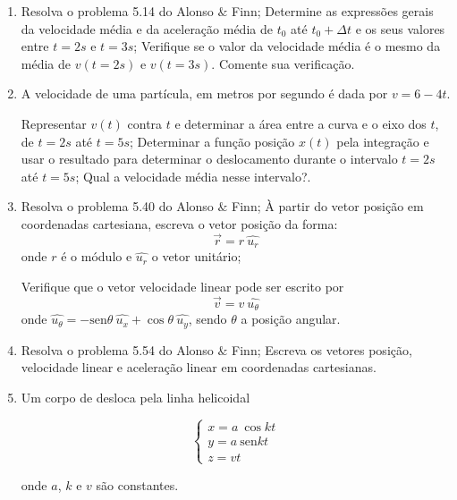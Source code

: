 \documentclass[12pt,a4paper]{article}
\newcommand{\sen}{\mathrm{sen}}
\begin{document}
\begin{enumerate}
\item 
\begin{tasks}
\task Resolva o problema 5.14 do Alonso $\&$ Finn;
\task Determine as expressões gerais da velocidade média e da aceleração média de $t_0$ até $t_0 + \Delta t$ e os seus valores entre $t=2s$ e $t=3s$;
\task Verifique se o valor da velocidade média é o mesmo da média de $v(t=2s)$ e $v(t=3s)$. Comente sua verificação.
\end{tasks}

\item A velocidade de uma partícula, em metros por segundo é dada por $v=6-4t$.
\begin{tasks}
\task Representar $v(t)$ contra $t$ e determinar a área entre a curva e o eixo dos $t$, de $t=2s$ até $t=5s$;
\task Determinar a função posição $x(t)$ pela integração e usar o resultado para determinar o deslocamento durante o intervalo $t=2s$ até $t=5s$;
\task Qual a velocidade média nesse intervalo?.
\end{tasks}
\item
\begin{tasks}
\task Resolva o problema 5.40 do Alonso $\&$ Finn;
\task À partir do vetor posição em coordenadas cartesiana, escreva o vetor posição da forma:
$$\vec{r}=r \ \hat{u_r}$$ onde $r$ é o módulo e $\hat{u_r}$ o vetor unitário;

\task Verifique que o vetor velocidade linear pode ser escrito por $$\vec{v}=v \ \hat{u_\theta}$$ onde $\hat{u_\theta} = -\sen{\theta} \ \hat{u_x} + \cos{\theta} \ \hat{u_y}$, sendo $\theta$ a posição angular.
\end{tasks}

\item 
\begin{tasks}
\task Resolva o problema 5.54 do Alonso $\&$ Finn;
\task Escreva os vetores posição, velocidade linear e aceleração linear em coordenadas cartesianas.\\
\end{tasks}

\item Um corpo de desloca pela linha helicoidal

$$\begin{cases} x=a \ \cos{kt} \\
y=a \ \sen{kt} \\
z=vt \end{cases}$$

onde $a$, $k$ e $v$ são constantes. 


\end{enumerate}
\end{document}
